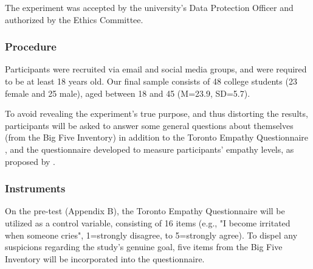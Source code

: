 The experiment was accepted by the university's Data Protection Officer and authorized by the Ethics Committee.

\subsubsection{Procedure}


Participants were recruited via email and social media groups, and were required to be at least 18 years old. Our final sample consists of 48 college students (23 female and 25 male), aged between 18 and 45 (M=23.9, SD=5.7). 



To avoid revealing the experiment's true purpose, and thus distorting the results, participants will be asked to answer some general questions about themselves (from the Big Five Inventory) in addition to the Toronto Empathy Questionnaire \cite{SPR03}, and the questionnaire developed to measure participants' empathy levels, as proposed by \cite{ROT19, ZIB19}. 


\subsubsection{Instruments}
On the pre-test (Appendix B), the Toronto Empathy Questionnaire \cite{SPR03} will be utilized as a control variable, consisting of 16 items (e.g., "I become irritated when someone cries", 1=strongly disagree, to 5=strongly agree). To dispel any suspicions regarding the study's genuine goal, five items from the Big Five Inventory \cite{JOH91} will be incorporated into the questionnaire.

